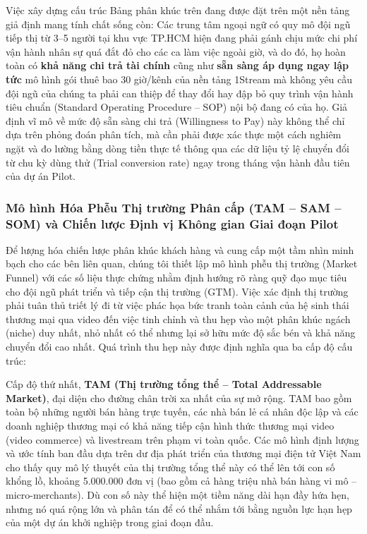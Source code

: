 \begin{WarningBox}
Việc xây dựng cấu trúc Bảng phân khúc trên đang được đặt trên một nền tảng giả định mang tính chất sống còn: Các trung tâm ngoại ngữ có quy mô đội ngũ tiếp thị từ 3--5 người tại khu vực TP.HCM hiện đang phải gánh chịu mức chi phí vận hành nhân sự quá đắt đỏ cho các ca làm việc ngoài giờ, và do đó, họ hoàn toàn có \textbf{khả năng chi trả tài chính} cũng như \textbf{sẵn sàng áp dụng ngay lập tức} mô hình gói thuê bao 30 giờ/kênh của nền tảng 1Stream mà không yêu cầu đội ngũ của chúng ta phải can thiệp để thay đổi hay đập bỏ quy trình vận hành tiêu chuẩn (Standard Operating Procedure -- SOP) nội bộ đang có của họ. Giả định vĩ mô về mức độ sẵn sàng chi trả (Willingness to Pay) này không thể chỉ dựa trên phỏng đoán phân tích, mà cần phải được xác thực một cách nghiêm ngặt và đo lường bằng dòng tiền thực tế thông qua các dữ liệu tỷ lệ chuyển đổi từ chu kỳ dùng thử (Trial conversion rate) ngay trong tháng vận hành đầu tiên của dự án Pilot.
\end{WarningBox}

\subsubsection{Mô hình Hóa Phễu Thị trường Phân cấp (TAM -- SAM -- SOM) và Chiến lược Định vị Không gian Giai đoạn Pilot}

Để lượng hóa chiến lược phân khúc khách hàng và cung cấp một tầm nhìn minh bạch cho các bên liên quan, chúng tôi thiết lập mô hình phễu thị trường (Market Funnel) với các số liệu thực chứng nhằm định hướng rõ ràng quỹ đạo mục tiêu cho đội ngũ phát triển và tiếp cận thị trường (GTM). Việc xác định thị trường phải tuân thủ triết lý đi từ việc phác họa bức tranh toàn cảnh của hệ sinh thái thương mại qua video đến việc tinh chỉnh và thu hẹp vào một phân khúc ngách (niche) duy nhất, nhỏ nhất có thể nhưng lại sở hữu mức độ sắc bén và khả năng chuyển đổi cao nhất. Quá trình thu hẹp này được định nghĩa qua ba cấp độ cấu trúc:

Cấp độ thứ nhất, \textbf{TAM (Thị trường tổng thể -- Total Addressable Market)}, đại diện cho đường chân trời xa nhất của sự mở rộng. TAM bao gồm toàn bộ những người bán hàng trực tuyến, các nhà bán lẻ cá nhân độc lập và các doanh nghiệp thương mại có khả năng tiếp cận hình thức thương mại video (video commerce) và livestream trên phạm vi toàn quốc. Các mô hình định lượng và ước tính ban đầu dựa trên dư địa phát triển của thương mại điện tử Việt Nam cho thấy quy mô lý thuyết của thị trường tổng thể này có thể lên tới con số khổng lồ, khoảng 5.000.000 đơn vị (bao gồm cả hàng triệu nhà bán hàng vi mô -- micro-merchants). Dù con số này thể hiện một tiềm năng dài hạn đầy hứa hẹn, nhưng nó quá rộng lớn và phân tán để có thể nhắm tới bằng nguồn lực hạn hẹp của một dự án khởi nghiệp trong giai đoạn đầu.

